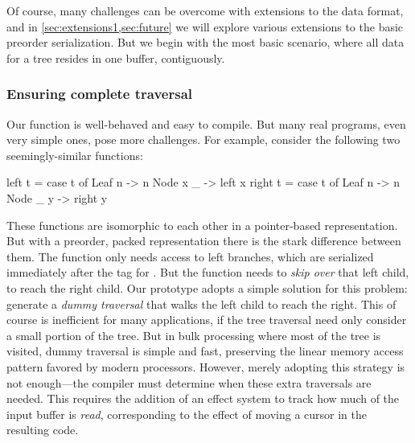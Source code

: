 \documentclass[a4paper,english]{lipics-v2016}
\newif\ifcurly
\begin{document}
Of course, many challenges can be overcome with extensions to the data
{format, and in \cref{sec:extensions1,sec:future} we will explore various
extensions to the basic preorder serialization}.  But we begin with the
most basic scenario, where all data for a tree resides in one buffer,
contiguously.


\subsubsection{Ensuring complete traversal} Our  function is
well-behaved and easy to compile. But many real programs, even very
simple ones, pose more challenges. For example, consider the following
two seemingly-similar functions:

\ifcurly
\begin{code}[language=c]
  fun left(t) {
    match(t) {
      Leaf(n):   return n;
      Node(x,_): return left(x);
  }}
  fun right(t) {
    match(t) {
      Leaf(n):   return n;
      Node(_,y): return right(y);
  }}
\end{code}
\else
\begin{code}
  left t = case t of
             Leaf n   -> n
             Node x _ -> left x
  right t = case t of
              Leaf n   -> n
              Node _ y -> right y
\end{code}
\fi

These functions are isomorphic to each other in a pointer-based
representation.  But with a preorder, packed representation there is
the stark difference between them.  The  function only needs
access to left branches, which are serialized immediately after the
tag for .  But the  function needs to {\em skip
  over} that left child, to reach the right child.  Our prototype
adopts a simple
solution for this problem: generate a {\em dummy traversal} that
walks the left child to reach the right.
%
This of course is inefficient for many applications, if the tree
traversal need only consider a small portion of the tree. But in bulk
processing where most of the tree is visited, dummy traversal is
simple and fast, preserving the linear memory access pattern favored
by modern processors. 
%
However, merely adopting this strategy is not enough---the compiler
must determine when these extra traversals are needed. This requires
the addition of an effect system to track how much of the input buffer
is \emph{read}, corresponding to the effect of moving a cursor in the
resulting code.

\end{document}
